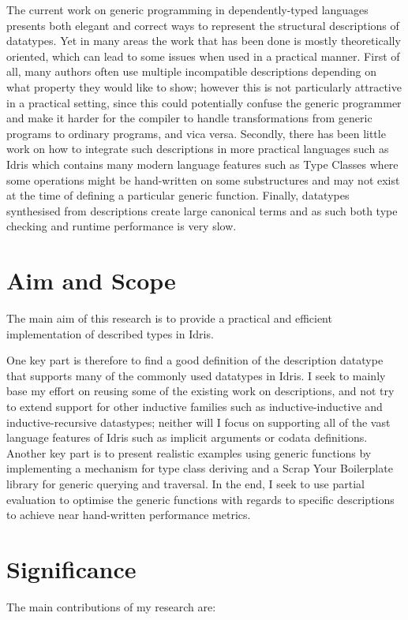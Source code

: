 \documentclass{ituthesis}
\begin{document}
The current work on generic programming in dependently-typed languages presents both elegant and correct ways to represent the structural descriptions of datatypes.
Yet in many areas the work that has been done is mostly theoretically oriented, which can lead to some issues when used in a practical manner.
First of all, many authors often use multiple incompatible descriptions depending on what property they would like to show; however this is not particularly attractive in a practical setting, since this could potentially confuse the generic programmer and make it harder for the compiler
to handle transformations from generic programs to ordinary programs, and vica versa.
Secondly, there has been little work on how to integrate such descriptions in more practical languages such as Idris which contains many modern language features such as Type Classes where some operations might be hand-written on some substructures and may not exist at the time of defining a particular generic function.
Finally, datatypes synthesised from descriptions create large canonical terms and as such both type checking and runtime performance is very slow.

\section{Aim and Scope}
\label{sec:AimandScope}
The main aim of this research is to provide a practical and efficient implementation of described types in Idris.

One key part is therefore to find a good definition of the description datatype that supports many of the commonly used datatypes in Idris.
I seek to mainly base my effort on reusing some of the existing work on descriptions, and not try to extend support for other inductive families such as inductive-inductive and inductive-recursive datastypes; neither will I focus on supporting all of the vast language features of Idris such as implicit arguments or codata definitions.
Another key part is to present realistic examples using generic functions by implementing a mechanism for type class deriving and a Scrap Your Boilerplate library for generic querying and traversal.
In the end, I seek to use partial evaluation to optimise the generic functions with regards to specific descriptions to achieve near hand-written performance metrics.

\section{Significance}
\label{sec:Significance}
The main contributions of my research are:
\end{document}
